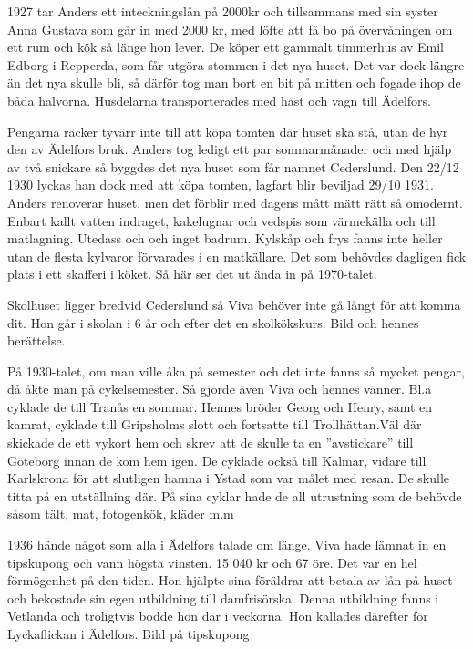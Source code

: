 1927 tar Anders ett inteckningslån på 2000kr och tillsammans med sin syster Anna Gustava som går in med 2000 kr, med löfte att få bo på övervåningen om ett rum och kök så länge hon lever. De köper ett gammalt timmerhus av Emil Edborg i Repperda, som får utgöra stommen i det nya huset. Det var dock längre än det nya skulle bli, så därför tog man bort en bit på mitten och fogade ihop de båda halvorna. Husdelarna transporterades med häst och vagn till Ädelfors.




Pengarna räcker tyvärr inte till att köpa tomten där huset ska stå, utan de hyr den av Ädelfors bruk. Anders tog ledigt ett par sommarmånader och med hjälp av två snickare så byggdes det nya huset som får namnet Cederslund. Den 22/12 1930 lyckas han dock med att köpa tomten, lagfart blir beviljad 29/10 1931. Anders renoverar huset, men det förblir med dagens mått mätt rätt så omodernt. Enbart kallt vatten indraget, kakelugnar och vedspis som värmekälla och till matlagning. Utedass och och inget badrum. Kylskåp och frys fanns inte heller utan de flesta kylvaror förvarades i en matkällare. Det som behövdes dagligen fick plats i ett skafferi i köket. Så här ser det ut ända in på 1970-talet.


Skolhuset ligger bredvid Cederslund så Viva behöver inte gå långt för att komma dit. Hon går i skolan i 6 år och efter det en skolkökskurs.
Bild och hennes berättelse.


På 1930-talet, om man ville åka på semester och det inte fanns så mycket pengar, då åkte man på cykelsemester. Så gjorde även Viva och hennes vänner. Bl.a cyklade de till Tranås en sommar. Hennes bröder Georg och Henry, samt en kamrat, cyklade till Gripsholms slott och fortsatte till Trollhättan.Väl där skickade de ett vykort hem och skrev att de skulle ta en ”avstickare” till Göteborg innan de kom hem igen. De cyklade också till Kalmar, vidare till Karlskrona för att slutligen hamna i Ystad som var målet med resan. De skulle titta på en utställning där.
På sina cyklar hade de all utrustning som de behövde såsom tält, mat, fotogenkök, kläder m.m


1936 hände något som alla i Ädelfors talade om länge. Viva hade lämnat in en tipskupong och vann högsta vinsten. 15 040 kr och 67 öre. Det var en hel förmögenhet på den tiden. Hon hjälpte sina föräldrar att betala av lån på huset och bekostade sin egen utbildning till damfrisörska. Denna utbildning fanns i Vetlanda och troligtvis bodde hon där i veckorna. Hon kallades därefter för Lyckaflickan i Ädelfors.
Bild på tipskupong



